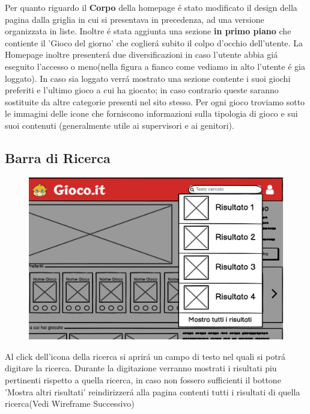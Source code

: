 \documentclass[../Report.tex]{subfiles}
\begin{document}
         Per quanto riguardo il \textbf{Corpo} della homepage  é stato modificato il design della pagina dalla griglia in cui si presentava in precedenza, ad una versione organizzata in liste.
         Inoltre é stata aggiunta una sezione \textbf{in primo piano} che contiente il 'Gioco del giorno' che coglierá subito il colpo d'occhio dell'utente.
         La Homepage inoltre presenterá due diversificazioni in caso l'utente abbia giá eseguito l'accesso o meno(nella figura a fianco come vediamo in alto l'utente é gia loggato).
         In caso sia loggato verrá mostrato una sezione contente i suoi giochi preferiti e l'ultimo gioco a cui ha giocato; in caso contrario queste saranno sostituite da altre categorie presenti nel sito stesso.
         Per ogni gioco troviamo sotto le immagini delle icone che forniscono informazioni sulla tipologia di gioco e sui suoi contenuti (generalmente utile ai supervisori e ai genitori).
         

    \subsection{Barra di Ricerca}
    \begin{figure}[H]
        \includegraphics[width=\linewidth]{WSearchBar.png}
        \centering
    \end{figure}
    
    Al click dell'icona della ricerca si aprirá un campo di testo nel quali si potrá digitare la ricerca.
    Durante la digitazione verranno mostrati i risultati piu pertinenti rispetto a quella ricerca, in caso non fossero sufficienti il bottone 'Mostra altri risultati' reindirizzerá alla pagina contenti tutti i risultati di quella ricerca(Vedi Wireframe Successivo)
\end{document}
